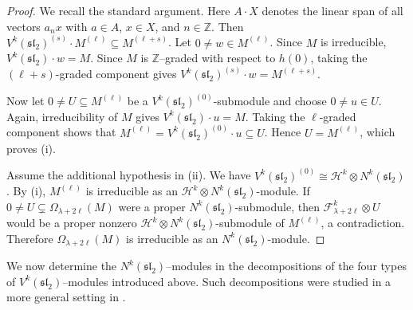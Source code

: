 \documentclass[11 pt]{amsart}
\theoremstyle{definition}
\theoremstyle{plain}
\begin{document}
\begin{proof}
We recall the standard argument.
Here $A\cdot X$ denotes the linear span of all vectors $a_nx$ with
$a\in A$, $x\in X$, and $n\in\mathbb Z$. Then
$V^k(\mathfrak{sl}_2)^{(s)}\cdot M^{(\ell)}
\subseteq M^{(\ell+s)}$.
Let $0\neq w\in M^{(\ell)}$.  Since $M$ is irreducible,
$V^k(\mathfrak{sl}_2)\cdot w=M$. Since $M$ is
$\mathbb Z$--graded with respect to $h(0)$, taking the
$(\ell+s)$-graded component gives
$V^k(\mathfrak{sl}_2)^{(s)}\cdot w=M^{(\ell+s)}$.

Now let $0\neq U\subseteq M^{(\ell)}$ be a
$V^k(\mathfrak{sl}_2)^{(0)}$-submodule and choose $0\neq u\in U$.
Again, irreducibility of $M$ gives
$V^k(\mathfrak{sl}_2)\cdot u=M$.  Taking the $\ell$-graded component
shows that
$M^{(\ell)}=V^k(\mathfrak{sl}_2)^{(0)}\cdot u\subseteq U$.
Hence $U=M^{(\ell)}$, which proves \textup{(i)}.

Assume the additional hypothesis in \textup{(ii)}. We have
$V^k(\mathfrak{sl}_2)^{(0)}
\cong\mathcal H^k\otimes N^k(\mathfrak{sl}_2)$.
By \textup{(i)}, $M^{(\ell)}$ is irreducible as an
$\mathcal H^k\otimes N^k(\mathfrak{sl}_2)$-module. If
$0\neq U\subsetneq\Omega_{\lambda+2\ell}(M)$ were a proper
$N^k(\mathfrak{sl}_2)$-submodule, then
$\mathcal F^k_{\lambda+2\ell}\otimes U$
would be a proper nonzero
$\mathcal H^k\otimes N^k(\mathfrak{sl}_2)$-submodule of
$M^{(\ell)}$, a contradiction.
Therefore $\Omega_{\lambda+2\ell}(M)$ is irreducible as an
$N^k(\mathfrak{sl}_2)$-module.
\end{proof}

We now determine the $N^k(\mathfrak{sl}_2)$--modules in the
decompositions of the four types of
$V^k(\mathfrak{sl}_2)$--modules introduced above. Such decompositions
were studied in a more general setting in \cite{CKLR}.
\end{document}
